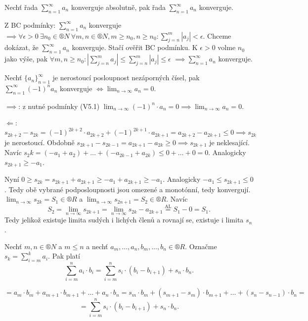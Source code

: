 \documentclass[12pt]{article}                   %
\begin{document}
        \begin{veta}
            Nechť řada $\sum_{n=1}^∞ a_n$ konverguje absolutně, pak řada $\sum_{n=1}^∞ a_n$ konverguje.

            \begin{dukazin}
                Z BC podmínky: $\sum_{n=1}^∞ a_n$ konverguje $\implies \forall\epsilon > 0 \ \exists n_0 \in ®N\ \forall m, n \in ®N, m ≥ n_0, n ≥ n_0: \sum_{j=n}^m \left| a_j \right| < \epsilon$. Chceme dokázat, že $\sum_{n=1}^∞ a_n$ konverguje. Stačí ověřit BC podmínku. K $\epsilon > 0$ volme $n_0$ jako výše, pak $\forall m, n ≥ n_0: \left| \sum_{j=n}^m a_j \right| ≤ \sum_{j=n}^m \left| a_j \right| ≤ \epsilon$ $\implies \sum_{n=1}^∞ a_n$ konverguje.
            \end{dukazin}
        \end{veta}

        \begin{veta}
            Nechť $\{a_n\}_{n = 1}^∞$ je nerostoucí posloupnost nezáporných čísel, pak $\sum_{n=1}^∞ (-1)^n a_n$ konverguje $\Leftrightarrow \lim_{n \rightarrow ∞} a_n = 0$.

            \begin{dukazin}
                $\implies$: z nutné podmínky (V5.1) $\lim_{n \rightarrow ∞} (-1)^n·a_n = 0 \implies \lim_{n \rightarrow ∞} a_n = 0$.

                $\Leftarrow$: $s_{2k + 2} - s_{2k} = (-1)^{2k+2}·a_{2k+2} + (-1)^{2k+1}·a_{2k+1} = a_{2k+2} - a_{2k+1} ≤ 0 \implies s_{2k}$ je nerostoucí. Obdobně $s_{2k+1} - s_{2k-1} = a_{2k+1} - a_{2k} ≥ 0 \implies s_{2k+1}$ je neklesající. Navíc $s_2k = (-a_1 + a_2) + … + (-a_{2k-1} + a_{2k}) ≤ 0 + … + 0 = 0$. Analogicky $s_{2k+1} ≥ -a_1$.

                Nyní $0 ≥ s_{2k} = s_{2k+1} + a_{2k+1} ≥ -a_1 + a_{2k+1} ≥ -a_1$. Analogicky $-a_1 ≤ s_{2k+1} ≤ 0$. Tedy obě vybrané podposloupnosti jsou omezené a monotónní, tedy konvergují. $\lim_{n \rightarrow ∞} s_{2k} = S_1 \in ®R$ a $\lim_{n \rightarrow ∞} s_{2n+1} = S_2 \in ®R$. Navíc
                $$ S_2 = \lim_{n \rightarrow ∞} s_{2k+1} = \lim_{n \rightarrow ∞} s_{2k} - a_{2k+1} \overset{\text{AL}}{=} S_1 - 0 = S_1. $$
                Tedy jelikož existuje limita sudých i lichých členů a rovnají se, existuje i limita $s_n$.
            \end{dukazin}
        \end{veta}

        \begin{lemma}
            Nechť $m, n \in ®N$ a $m ≤ n$ a nechť $a_m, …, a_n, b_m, …, b_n \in ®R$. Označme $s_k = \sum_{i=m}^k a_i$. Pak platí
            $$ \sum_{i=m}^n a_i·b_i = \sum_{i=m}^n s_i·(b_i - b_{i+1}) + s_n·b_n. $$
            
            \begin{dukazin}
                $$ = a_m · b_m + a_{m+1} · b_{m+1} + … + a_n·b_n = s_m·b_m + (s_{m+1} - s_m)· b_{m+1} + … + (s_n - s_{n-1})·b_n = $$
                $$ = \sum_{i=m}^n s_i·(b_i - b_{i+1}) + s_n·b_n. $$ 
            \end{dukazin}
        \end{lemma}
\end{document}
